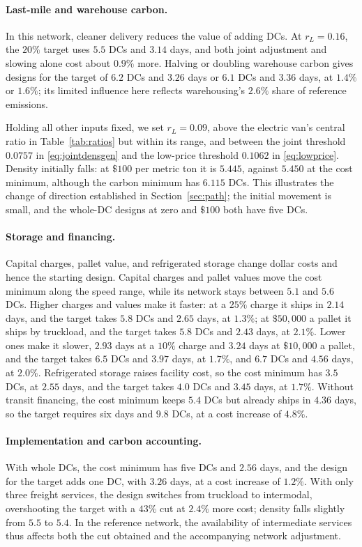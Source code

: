 \documentclass[11pt]{article}
\numberwithin{proposition}{section}
\theoremstyle{definition}
\theoremstyle{remark}
\theoremstyle{plain}
\begin{document}
\paragraph{Last-mile and warehouse carbon.} In this network, cleaner delivery reduces the value of adding DCs. At $r_L=0.16$,
the $20\%$ target uses $5.5$ DCs and $3.14$ days, and both joint adjustment and slowing alone cost about
$0.9\%$ more. Halving or doubling warehouse carbon gives designs for the target of $6.2$ DCs and $3.26$ days or $6.1$ DCs and
$3.36$ days, at $1.4\%$ or $1.6\%$; its limited influence here reflects warehousing's $2.6\%$ share of reference
emissions.

Holding all other inputs fixed, we set $r_L=0.09$, above the electric van's central ratio in Table~\ref{tab:ratios} but within its range,
and between the joint threshold $0.0757$ in \eqref{eq:jointdensgen} and the low-price
threshold $0.1062$ in \eqref{eq:lowprice}. Density initially falls: at $\$100$ per metric ton it is $5.445$,
against $5.450$ at the cost minimum, although the carbon minimum has $6.115$ DCs. This illustrates the change of
direction established in Section~\ref{sec:path}; the initial movement is small, and the whole-DC designs at
zero and $\$100$ both have five DCs.

\paragraph{Storage and financing.} Capital charges, pallet value, and refrigerated storage change dollar costs
and hence the starting design. Capital charges and pallet values move the cost minimum along the speed range, while its
network stays between $5.1$ and $5.6$ DCs. Higher charges and values make it faster: at a $25\%$ charge it ships in $2.14$ days, and the target takes $5.8$
DCs and $2.65$ days, at $1.3\%$; at $\$50{,}000$ a pallet it ships by truckload, and the target takes $5.8$ DCs and
$2.43$ days, at $2.1\%$. Lower ones make it slower, $2.93$ days at a $10\%$ charge and $3.24$ days at
$\$10{,}000$ a pallet, and the target takes $6.5$ DCs and $3.97$ days, at $1.7\%$, and $6.7$ DCs and $4.56$ days,
at $2.0\%$. Refrigerated storage raises facility cost, so the cost minimum has $3.5$ DCs, at $2.55$ days, and the
target takes $4.0$ DCs and $3.45$ days, at $1.7\%$. Without transit financing, the
cost minimum keeps $5.4$ DCs but already ships in $4.36$ days, so the target requires six days and $9.8$ DCs, at a cost increase of
$4.8\%$.

\paragraph{Implementation and carbon accounting.} With whole DCs, the cost minimum has five DCs and $2.56$ days,
and the design for the target adds one DC, with $3.26$ days, at a cost increase of $1.2\%$.
With only three freight services, the design switches from truckload to intermodal, overshooting the target with a
$43\%$ cut at $2.4\%$ more cost; density falls slightly from $5.5$ to $5.4$. In the reference network, the availability of intermediate services thus affects both the cut obtained and the
accompanying network adjustment.
\end{document}
